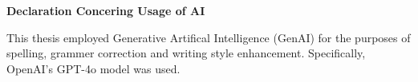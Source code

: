 \thispagestyle{empty}

\begin{center}
  {\Large\bfseries Declaration Concering Usage of AI}
\end{center}

\noindent
This thesis employed Generative Artifical Intelligence (GenAI) for the purposes of spelling, grammer correction and writing style enhancement. Specifically, OpenAI's GPT-4o model was used.

\signature{Signature of student}

\cleardoublepage\par
